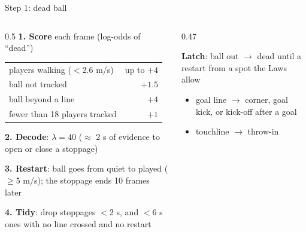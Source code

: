 \documentclass[aspectratio=169,10pt]{beamer}
\newcommand{\pitchbg}{\fill[green!8] (-2,-2) rectangle (107,70);}
\newcommand{\pitchlines}{%
  \draw[black!45,line width=0.4pt]
    (0,0) rectangle (105,68)  (52.5,0) -- (52.5,68)  (52.5,34) circle (9.15)
    (0,13.84) rectangle (16.5,54.16)  (105,13.84) rectangle (88.5,54.16)
    (0,24.84) rectangle (5.5,43.16)   (105,24.84) rectangle (99.5,43.16)
    (0,30.34) rectangle (-1.5,37.66)  (105,30.34) rectangle (106.5,37.66);
  \fill[black!45] (52.5,34) circle (0.5);}
\begin{document}
\begin{frame}{Step 1: dead ball}
  \begin{columns}[T]
    \begin{column}{0.5\textwidth}
      \textbf{1. Score} each frame (log-odds of ``dead'')
      \vspace{0.05cm}

      \small
      \begin{tabular}{lr}
        \toprule
        players walking ($<$2.6 m/s) & up to $+4$ \\
        ball not tracked & $+1.5$ \\
        ball beyond a line & $+4$ \\
        fewer than 18 players tracked & $+1$ \\
        \bottomrule
      \end{tabular}

      \vspace{0.15cm}
      \normalsize\textbf{2. Decode}: $\lambda=40$ ($\approx$ 2 s of evidence to open or close a stoppage)

      \vspace{0.1cm}
      \textbf{3. Restart}: ball goes from quiet to played ($\ge$5 m/s);
      the stoppage ends 10 frames later

      \vspace{0.1cm}
      \textbf{4. Tidy}: drop stoppages $<$2 s, and $<$6 s ones with no line crossed and no restart
    \end{column}
    \begin{column}{0.47\textwidth}
      \centering

      \vspace{0.2cm}
      \raggedright\small
      \textbf{Latch}: ball out $\to$ dead until a restart from a spot the Laws allow
      \begin{itemize}\scriptsize
        \item goal line $\to$ corner, goal kick, or kick-off after a goal
        \item touchline $\to$ throw-in
      \end{itemize}
    \end{column}
  \end{columns}
\end{frame}
\end{document}
